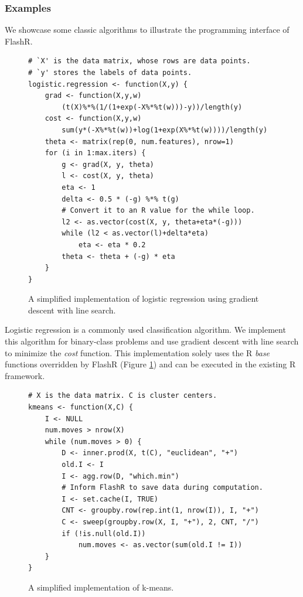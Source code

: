 \subsubsection{Examples} \label{sec:apps}
We showcase some classic algorithms to illustrate the programming interface
of FlashR.

\begin{figure}
\begin{verbatim}
# `X' is the data matrix, whose rows are data points.
# `y' stores the labels of data points.
logistic.regression <- function(X,y) {
	grad <- function(X,y,w)
		(t(X)%*%(1/(1+exp(-X%*%t(w)))-y))/length(y)
	cost <- function(X,y,w)
		sum(y*(-X%*%t(w))+log(1+exp(X%*%t(w))))/length(y)
	theta <- matrix(rep(0, num.features), nrow=1)
	for (i in 1:max.iters) {
		g <- grad(X, y, theta)
		l <- cost(X, y, theta)
		eta <- 1
		delta <- 0.5 * (-g) %*% t(g)
		# Convert it to an R value for the while loop.
		l2 <- as.vector(cost(X, y, theta+eta*(-g)))
		while (l2 < as.vector(l)+delta*eta)
			eta <- eta * 0.2
		theta <- theta + (-g) * eta
	}
}
\end{verbatim}
\vspace{-10pt}
\caption{A simplified implementation of logistic regression using
  gradient descent with line search.}
\label{logistic}
\vspace{-5pt}
\end{figure}

Logistic regression is a commonly used classification algorithm. We implement
this algorithm for binary-class problems and use gradient descent with
line search to minimize the \textit{cost} function. This implementation
solely uses the R \textit{base} functions overridden by FlashR (Figure
\ref{logistic}) and can be executed in the existing R framework.

\begin{figure}
\centering
\begin{verbatim}
# X is the data matrix. C is cluster centers.
kmeans <- function(X,C) {
	I <- NULL
	num.moves > nrow(X)
	while (num.moves > 0) {
		D <- inner.prod(X, t(C), "euclidean", "+")
		old.I <- I
		I <- agg.row(D, "which.min")
		# Inform FlashR to save data during computation.
		I <- set.cache(I, TRUE)
		CNT <- groupby.row(rep.int(1, nrow(I)), I, "+")
		C <- sweep(groupby.row(X, I, "+"), 2, CNT, "/")
		if (!is.null(old.I))
			num.moves <- as.vector(sum(old.I != I))
	}
}
\end{verbatim}
\vspace{-10pt}
	\caption{A simplified implementation of k-means.}
	\label{fig:kmeans}
\vspace{-10pt}
\end{figure}

